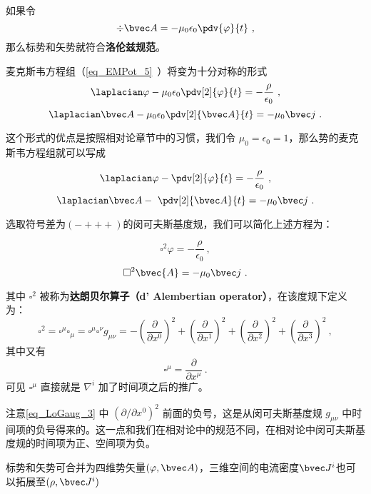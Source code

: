 
\begin{issues}
\issueDraft
\end{issues}


如果令
\begin{equation}
\div \bvec A = -\mu_0 \epsilon_0 \pdv{\varphi}{t}~,
\end{equation}
那么标势和矢势就符合\textbf{洛伦兹规范}。 

麦克斯韦方程组（\autoref{eq_EMPot_5}~）将变为十分对称的形式
\begin{equation}\label{eq_LoGaug_1}
\laplacian \varphi - \mu_0\epsilon_0 \pdv[2]{\varphi}{t} = -\frac{\rho}{\epsilon_0}~,
\end{equation}
\begin{equation}\label{eq_LoGaug_2}
\laplacian \bvec A - \mu_0\epsilon_0 \pdv[2]{\bvec A}{t} = -\mu_0 \bvec j~.
\end{equation}

这个形式的优点是按照相对论章节中的习惯，我们令 $\mu_0=\epsilon_0=1$，那么势的麦克斯韦方程组就可以写成

\begin{equation}
\laplacian \varphi -  \pdv[2]{\varphi}{t} = -\frac{\rho}{\epsilon_0}~,
\end{equation}
\begin{equation}
\laplacian \bvec A - \ \pdv[2]{\bvec A}{t} = -\mu_0 \bvec j~.
\end{equation}

选取符号差为$(-+++)$的闵可夫斯基度规，我们可以简化上述方程为：

\begin{equation}
\square^2 \varphi = -\frac{\rho}{\epsilon_0}~,
\end{equation}
\begin{equation}
\square^2 \bvec{A} = -\mu_0 \bvec j~.
\end{equation}

其中 $\square^2$ 被称为\textbf{达朗贝尔算子（d' Alembertian operator）}，在该度规下定义为：
\begin{equation}\label{eq_LoGaug_3}
\square^2=\square^\mu\square_\mu=\square^\mu\square^\nu g_{\mu\nu}=-(\frac{\partial}{\partial x^0})^2+(\frac{\partial}{\partial x^1})^2+(\frac{\partial}{\partial x^2})^2+(\frac{\partial}{\partial x^3})^2~,
\end{equation}
其中又有
\begin{equation}
\square^\mu=\frac{\partial}{\partial x^\mu}~.
\end{equation}
可见 $\square^\mu$ 直接就是 $\nabla^i$ 加了时间项之后的推广。

注意\autoref{eq_LoGaug_3} 中 $(\partial/\partial x^0)^2$ 前面的负号，这是从闵可夫斯基度规 $g_{\mu\nu}$ 中时间项的负号得来的。这一点和我们在相对论中的规范不同，在相对论中闵可夫斯基度规的时间项为正、空间项为负。

标势和矢势可合并为四维势矢量$(\varphi,\bvec A)$，三维空间的电流密度$\bvec J^i$也可以拓展至$(\rho, \bvec J^i)$





